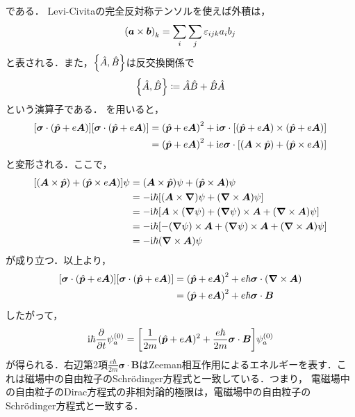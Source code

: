 \documentclass{report}
\begin{document}
  である．
  Levi-Civitaの完全反対称テンソルを使えば外積は，
  \begin{align}
    \qty(\bm{a} \times \bm{b})_k = \sum_{i} \sum_{j} \varepsilon_{ijk} a_i b_j
  \end{align}
  と表される．また，$\qty{\hat{A},\hat{B}}$は反交換関係で
  \begin{align}
    \qty{\hat{A},\hat{B}} \coloneqq \hat{A}\hat{B} + \hat{B}\hat{A}
  \end{align}
  という演算子である．
  を用いると，
  \begin{align}
    \qty[\bm{\sigma}\cdot\qty(\hat{\bm{p}} + e\bm{A})]\qty[\bm{\sigma}\cdot\qty(\hat{\bm{p}} + e\bm{A})] &= \qty(\hat{\bm{p}} + e\bm{A})^2 + \mathrm{i} \bm{\sigma} \cdot \qty[\qty(\hat{\bm{p}} + e\bm{A}) \times (\hat{\bm{p}} + e\bm{A})]\\
    &= \qty(\hat{\bm{p}} + e\bm{A})^2 + \mathrm{i} e \bm{\sigma} \cdot \qty[\qty(\bm{A} \times \hat{\bm{p}}) + \qty(\hat{\bm{p}} \times e\bm{A})]\\
  \end{align}
  と変形される．ここで，
  \begin{align}
    \qty[\qty(\bm{A} \times \hat{\bm{p}}) + \qty(\hat{\bm{p}} \times e\bm{A})]\psi &= \qty(\bm{A} \times \hat{\bm{p}})\psi + \qty(\hat{\bm{p}} \times \bm{A})\psi\\
    &= -\mathrm{i} \hbar \qty[\qty(\bm{A} \times \grad) \psi + \qty(\grad \times \bm{A}) \psi]\\
    &= -\mathrm{i}\hbar \qty[\bm{A} \times \qty(\grad \psi) + \qty(\grad\psi)\times \bm{A} + \qty(\grad \times \bm{A}) \psi]\\
    &= -\mathrm{i}\hbar \qty[-\qty(\grad\psi)\times \bm{A} + \qty(\grad\psi)\times \bm{A} + \qty(\grad \times \bm{A}) \psi]\\
    &= -\mathrm{i}\hbar\qty(\grad \times \bm{A}) \psi
  \end{align}
  が成り立つ．以上より，
  \begin{align}
    \qty[\bm{\sigma}\cdot\qty(\hat{\bm{p}} + e\bm{A})]\qty[\bm{\sigma}\cdot\qty(\hat{\bm{p}} + e\bm{A})] &= \qty(\hat{\bm{p}} + e\bm{A})^2 + e\hbar \bm{\sigma}\cdot\qty(\grad \times \bm{A})\\
    &= \qty(\hat{\bm{p}} + e\bm{A})^2 + e\hbar \bm{\sigma} \cdot \bm{B}
  \end{align}
  したがって，
  \begin{align}
    \mathrm{i}\hbar \pdv{t} \psi_a^{(0)} = \qty[\frac{1}{2m} (\hat{\bm{p}} + e\bm{A})^2 + \frac{e\hbar}{2m}\bm{\sigma}\cdot\bm{B}] \psi_a^{(0)}
  \end{align}
  が得られる．右辺第2項$\frac{e\hbar}{2m}\bm{\sigma}\cdot\bm{B}$はZeeman相互作用によるエネルギーを表す．これは磁場中の自由粒子のSchrödinger方程式と一致している．つまり，
  電磁場中の自由粒子のDirac方程式の非相対論的極限は，電磁場中の自由粒子のSchrödinger方程式と一致する．
  
\end{document}
